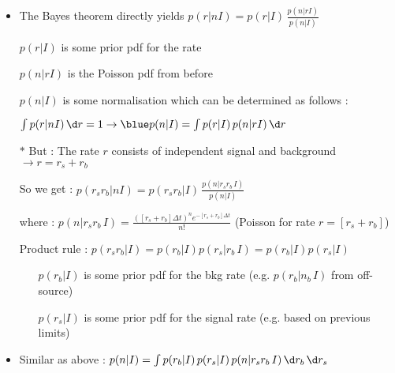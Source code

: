 \Tr
\begin{itemize}
\item The Bayes theorem directly yields {\blue $\displaystyle p(r|nI)=p(r|I)\,\frac{p(n|rI)}{p(n|I)}$}
\item[] $p(r|I)$ is some prior pdf for the rate
\item[] $p(n|rI)$ is the Poisson pdf from before
\item[] $p(n|I)$ is some normalisation which can be determined as follows :
\item[] $\int p(r|nI)\,\d r = 1 \rightarrow {\blue p(n|I)=\int p(r|I)\,p(n|rI)\,\d r}$
\item[$\ast$] But : {\red The rate $r$ consists of independent signal and background $\rightarrow r=r_{s}+r_{b}$}
\item[] So we get : {\blue $\displaystyle p(r_{s}r_{b}|nI)=p(r_{s}r_{b}|I)\,\frac{p(n|r_{s}r_{b}\,I)}{p(n|I)}$}
\item[] where : {\blue $\displaystyle p(n|r_{s}r_{b}\,I)=\frac{([r_{s}+r_{b}]\Delta t)^{n} e^{-[r_{s}+r_{b}]\Delta t}}{n!}$}
        (Poisson for rate $r=[r_{s}+r_{b}]$)
\item[] Product rule : $p(r_{s}r_{b}|I)=p(r_{b}|I)p(r_{s}|r_{b}\,I)=p(r_{b}|I)p(r_{s}|I)$
\begin{itemize}
\item[] $p(r_{b}|I)$ is some prior pdf for the bkg rate (e.g. $p(r_{b}|n_{b}\,I)$ from off-source) 
\item[] $p(r_{s}|I)$ is some prior pdf for the signal rate (e.g. based on previous limits) 
\end{itemize}
\item Similar as above : {\blue $p(n|I)=\int p(r_{b}|I)\,p(r_{s}|I)\,p(n|r_{s}r_{b}\,I)\,\d r_{b}\,\d r_{s}$}
\end{itemize}

